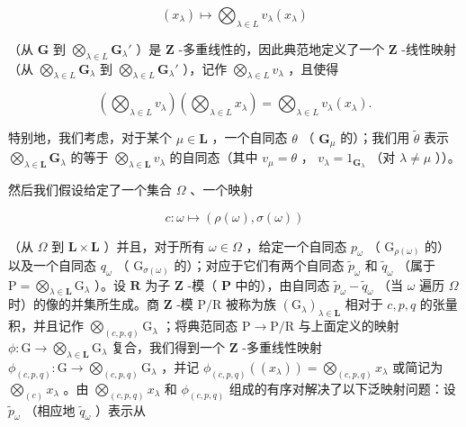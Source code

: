 \[
(x _ {\lambda}) \mapsto \bigotimes_ {\lambda \in L} v _ {\lambda} (x _ {\lambda})
\]

（从 \(\mathbf{G}\) 到 \(\bigotimes_{\lambda \in L} \mathbf{G}_{\lambda}'\) ）是 \(\mathbf{Z}\) -多重线性的，因此典范地定义了一个 \(\mathbf{Z}\) -线性映射（从 \(\bigotimes_{\lambda \in L} \mathbf{G}_{\lambda}\) 到 \(\bigotimes_{\lambda \in L} \mathbf{G}_{\lambda}'\) ），记作 \(\bigotimes_{\lambda \in L} v_{\lambda}\) ，且使得

\[
\left(\bigotimes_ {\lambda \in L} v _ {\lambda}\right) \left(\bigotimes_ {\lambda \in L} x _ {\lambda}\right) = \bigotimes_ {\lambda \in L} v _ {\lambda} (x _ {\lambda}).\tag{25}
\]

特别地，我们考虑，对于某个 \(\mu \in \mathbf{L}\) ，一个自同态 \(\theta\) （ \(\mathbf{G}_{\mu}\) 的）；我们用 \(\tilde{\theta}\) 表示 \(\bigotimes_{\lambda \in \mathbf{L}} \mathbf{G}_{\lambda}\) 的等于 \(\bigotimes_{\lambda \in \mathbf{L}} v_{\lambda}\) 的自同态（其中 \(v_{\mu} = \theta\) ， \(v_{\lambda} = 1_{\mathbf{G}_{\lambda}}\) （对 \(\lambda \neq \mu\) ））。

然后我们假设给定了一个集合 \(\Omega\) 、一个映射

\[
c: \omega \mapsto (\rho (\omega), \sigma (\omega))
\]

（从 \(\Omega\) 到 \(\mathbf{L} \times \mathbf{L}\) ）并且，对于所有 \(\omega \in \Omega\) ，给定一个自同态 \(p_{\omega}\) （ \(\mathrm{G}_{\rho(\omega)}\) 的）以及一个自同态 \(q_{\omega}\) （ \(\mathrm{G}_{\sigma(\omega)}\) 的）；对应于它们有两个自同态 \(\tilde{p}_{\omega}\) 和 \(\tilde{q}_{\omega}\) （属于 \(\mathrm{P} = \bigotimes_{\lambda \in \mathbf{L}} \mathrm{G}_{\lambda}\) ）。设 \(\mathbf{R}\) 为子 \(\mathbf{Z}\) -模（ \(\mathbf{P}\) 中的），由自同态 \(\tilde{p}_{\omega} - \tilde{q}_{\omega}\) （当 \(\omega\) 遍历 \(\Omega\) 时）的像的并集所生成。商 \(\mathbf{Z}\) -模 \(\mathrm{P/R}\) 被称为族 \((\mathrm{G}_{\lambda})_{\lambda \in \mathbf{L}}\) 相对于 \(c, p, q\) 的张量积，并且记作 \(\bigotimes_{(c, p, q)} \mathrm{G}_{\lambda}\) ；将典范同态 \(\mathrm{P} \to \mathrm{P/R}\) 与上面定义的映射 \(\phi: \mathrm{G} \to \bigotimes_{\lambda \in \mathbf{L}} \mathrm{G}_{\lambda}\) 复合，我们得到一个 \(\mathbf{Z}\) -多重线性映射 \(\phi_{(c, p, q)}: \mathrm{G} \to \bigotimes_{(c, p, q)} \mathrm{G}_{\lambda}\) ，并记 \(\phi_{(c, p, q)}((x_{\lambda})) = \bigotimes_{(c, p, q)} x_{\lambda}\) 或简记为 \(\bigotimes_{(c)} x_{\lambda}\) 。由 \(\bigotimes_{(c, p, q)} x_{\lambda}\) 和 \(\phi_{(c, p, q)}\) 组成的有序对解决了以下泛映射问题：设 \(\tilde{p}_{\omega}\) （相应地 \(\tilde{q}_{\omega}\) ）表示从

